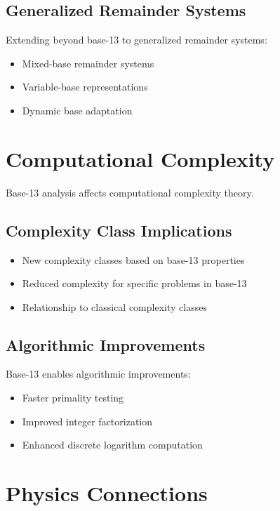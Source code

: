 \documentclass[12pt,a4paper]{report}
\begin{document}
\subsection{Generalized Remainder Systems}

Extending beyond base-13 to generalized remainder systems:

\begin{itemize}
\item Mixed-base remainder systems
\item Variable-base representations
\item Dynamic base adaptation
\end{itemize}

\section{Computational Complexity}

Base-13 analysis affects computational complexity theory.

\subsection{Complexity Class Implications}

\begin{itemize}
\item New complexity classes based on base-13 properties
\item Reduced complexity for specific problems in base-13
\item Relationship to classical complexity classes
\end{itemize}

\subsection{Algorithmic Improvements}

Base-13 enables algorithmic improvements:
\begin{itemize}
\item Faster primality testing
\item Improved integer factorization
\item Enhanced discrete logarithm computation
\end{itemize}

\section{Physics Connections}
\end{document}
